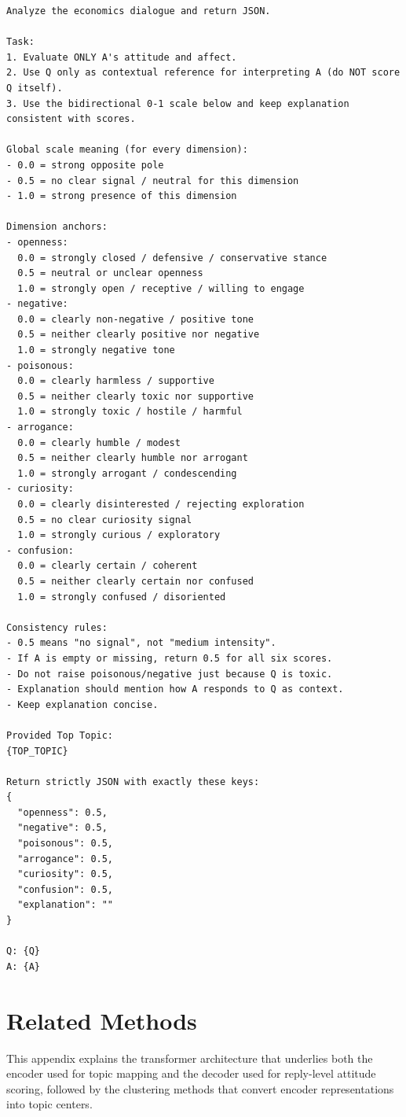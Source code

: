 \documentclass[11pt]{article}
\begin{document}
\begin{Verbatim}[fontsize=\footnotesize]
Analyze the economics dialogue and return JSON.

Task:
1. Evaluate ONLY A's attitude and affect.
2. Use Q only as contextual reference for interpreting A (do NOT score Q itself).
3. Use the bidirectional 0-1 scale below and keep explanation consistent with scores.

Global scale meaning (for every dimension):
- 0.0 = strong opposite pole
- 0.5 = no clear signal / neutral for this dimension
- 1.0 = strong presence of this dimension

Dimension anchors:
- openness:
  0.0 = strongly closed / defensive / conservative stance
  0.5 = neutral or unclear openness
  1.0 = strongly open / receptive / willing to engage
- negative:
  0.0 = clearly non-negative / positive tone
  0.5 = neither clearly positive nor negative
  1.0 = strongly negative tone
- poisonous:
  0.0 = clearly harmless / supportive
  0.5 = neither clearly toxic nor supportive
  1.0 = strongly toxic / hostile / harmful
- arrogance:
  0.0 = clearly humble / modest
  0.5 = neither clearly humble nor arrogant
  1.0 = strongly arrogant / condescending
- curiosity:
  0.0 = clearly disinterested / rejecting exploration
  0.5 = no clear curiosity signal
  1.0 = strongly curious / exploratory
- confusion:
  0.0 = clearly certain / coherent
  0.5 = neither clearly certain nor confused
  1.0 = strongly confused / disoriented

Consistency rules:
- 0.5 means "no signal", not "medium intensity".
- If A is empty or missing, return 0.5 for all six scores.
- Do not raise poisonous/negative just because Q is toxic.
- Explanation should mention how A responds to Q as context.
- Keep explanation concise.

Provided Top Topic:
{TOP_TOPIC}

Return strictly JSON with exactly these keys:
{
  "openness": 0.5,
  "negative": 0.5,
  "poisonous": 0.5,
  "arrogance": 0.5,
  "curiosity": 0.5,
  "confusion": 0.5,
  "explanation": ""
}

Q: {Q}
A: {A}
\end{Verbatim}

\section{Related Methods}
\label{app:transformer_background}

This appendix explains the transformer architecture that underlies both the encoder used for topic mapping and the decoder used for reply-level attitude scoring, followed by the clustering methods that convert encoder representations into topic centers.
\end{document}
